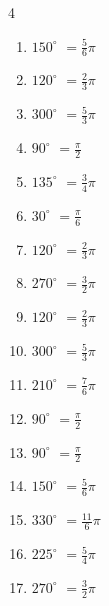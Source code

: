 \begin{multicols}{4}
\begin{enumerate}
  \item $\displaystyle 150^{\circ}$
        $\displaystyle =\frac{5}{6}\pi$

  \item $\displaystyle 120^{\circ}$
        $\displaystyle =\frac{2}{3}\pi$

  \item $\displaystyle 300^{\circ}$
        $\displaystyle =\frac{5}{3}\pi$

  \item $\displaystyle 90^{\circ}$
        $\displaystyle =\frac{\pi}{2}$

  \item $\displaystyle 135^{\circ}$
        $\displaystyle =\frac{3}{4}\pi$

  \item $\displaystyle 30^{\circ}$
        $\displaystyle =\frac{\pi}{6}$

  \item $\displaystyle 120^{\circ}$
        $\displaystyle =\frac{2}{3}\pi$

  \item $\displaystyle 270^{\circ}$
        $\displaystyle =\frac{3}{2}\pi$

  \item $\displaystyle 120^{\circ}$
        $\displaystyle =\frac{2}{3}\pi$

  \item $\displaystyle 300^{\circ}$
        $\displaystyle =\frac{5}{3}\pi$

  \item $\displaystyle 210^{\circ}$
        $\displaystyle =\frac{7}{6}\pi$

  \item $\displaystyle 90^{\circ}$
        $\displaystyle =\frac{\pi}{2}$

  \item $\displaystyle 90^{\circ}$
        $\displaystyle =\frac{\pi}{2}$

  \item $\displaystyle 150^{\circ}$
        $\displaystyle =\frac{5}{6}\pi$

  \item $\displaystyle 330^{\circ}$
        $\displaystyle =\frac{11}{6}\pi$

  \item $\displaystyle 225^{\circ}$
        $\displaystyle =\frac{5}{4}\pi$

  \item $\displaystyle 270^{\circ}$
        $\displaystyle =\frac{3}{2}\pi$


\end{enumerate}
\end{multicols}
